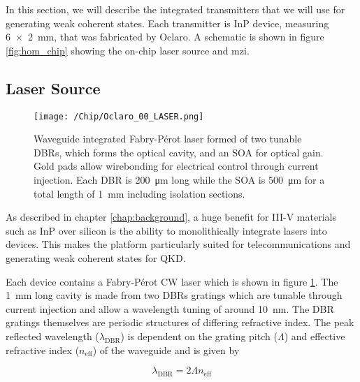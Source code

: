 In this section, we will describe the integrated transmitters that we will use for generating weak coherent states. Each transmitter is \ac{InP} device, measuring \SI{6x2}{mm}, that was fabricated by Oclaro. A schematic is shown in figure \ref{fig:hom_chip} showing the on-chip laser source and \ac{mzi}.

\subsection{Laser Source}

\begin{figure}[tp]
	\centering
	\texttt{[image: /Chip/Oclaro\_00\_LASER.png]}
	\caption[Microscope image of the waveguide integrated Fabry-P\'{e}rot laser]{Waveguide integrated Fabry-P\'{e}rot laser formed of two tunable \acp{DBR}, which forms the optical cavity, and an \ac{SOA} for optical gain. Gold pads allow wirebonding for electrical control through current injection. Each \ac{DBR} is \SI{200}{\um} long while the \ac{SOA} is \SI{500}{\um} for a total length of \SI{1}{\mm} including isolation sections.}
	\label{fig:InP_laser}
\end{figure}

As described in chapter \ref{chap:background}, a huge benefit for III-V materials such as \ac{InP} over silicon is the ability to monolithically integrate lasers into devices. This makes the platform particularly suited for telecommunications and generating weak coherent states for \ac{QKD}. 


Each device contains a Fabry-P\'{e}rot \ac{CW} laser which is shown in figure \ref{fig:InP_laser}. The \SI{1}{mm} long cavity is made from two \acp{DBR} gratings which are tunable through current injection and allow a wavelength tuning of around \SI{10}{nm}. The \ac{DBR} gratings themselves are periodic structures of differing refractive index. The peak reflected wavelength ($\lambda_\text{DBR}$) is dependent on the grating pitch ($\Lambda$) and effective refractive index ($n_\text{eff}$) of the waveguide and is given by

\begin{equation}
	\lambda_\text{DBR} = 2\Lambda n_\text{eff}
\end{equation}

